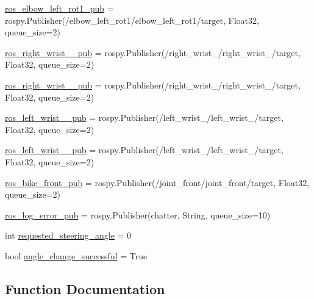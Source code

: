 \begin{DoxyCompactItemize}
\item 
\mbox{\hyperlink{namespacesteering__simulation_a7cf7d50a6b2f01251abedd8a59233be3}{ros\+\_\+elbow\+\_\+left\+\_\+rot1\+\_\+pub}} = rospy.\+Publisher(\textquotesingle{}/elbow\+\_\+left\+\_\+rot1/elbow\+\_\+left\+\_\+rot1/target\textquotesingle{}, Float32, queue\+\_\+size=2)
\item 
\mbox{\hyperlink{namespacesteering__simulation_a8e0b19adafe885231a487bf8378b0fa3}{ros\+\_\+right\+\_\+wrist\+\_\+\_\+pub}} = rospy.\+Publisher(\textquotesingle{}/right\+\_\+wrist\+\_/right\+\_\+wrist\+\_/target\textquotesingle{}, Float32, queue\+\_\+size=2)
\item 
\mbox{\hyperlink{namespacesteering__simulation_a7650fabdc834af9527c1add7de4e3c7e}{ros\+\_\+right\+\_\+wrist\+\_\+\_\+pub}} = rospy.\+Publisher(\textquotesingle{}/right\+\_\+wrist\+\_/right\+\_\+wrist\+\_/target\textquotesingle{}, Float32, queue\+\_\+size=2)
\item 
\mbox{\hyperlink{namespacesteering__simulation_aae568c25dad5bee09d010a369a03d5c4}{ros\+\_\+left\+\_\+wrist\+\_\+\_\+pub}} = rospy.\+Publisher(\textquotesingle{}/left\+\_\+wrist\+\_/left\+\_\+wrist\+\_/target\textquotesingle{}, Float32, queue\+\_\+size=2)
\item 
\mbox{\hyperlink{namespacesteering__simulation_ab5f317214f6776ddc111dee9afe1f0c3}{ros\+\_\+left\+\_\+wrist\+\_\+\_\+pub}} = rospy.\+Publisher(\textquotesingle{}/left\+\_\+wrist\+\_/left\+\_\+wrist\+\_/target\textquotesingle{}, Float32, queue\+\_\+size=2)
\item 
\mbox{\hyperlink{namespacesteering__simulation_a2f98d3e960637df34f895f4ccee97bbe}{ros\+\_\+bike\+\_\+front\+\_\+pub}} = rospy.\+Publisher(\textquotesingle{}/joint\+\_\+front/joint\+\_\+front/target\textquotesingle{}, Float32, queue\+\_\+size=2)
\item 
\mbox{\hyperlink{namespacesteering__simulation_af24aa0340a9184e1a00a96bc8d68aef8}{ros\+\_\+log\+\_\+error\+\_\+pub}} = rospy.\+Publisher(\textquotesingle{}chatter\textquotesingle{}, String, queue\+\_\+size=10)
\item 
int \mbox{\hyperlink{namespacesteering__simulation_a1906425964226a8e34fc3f159b4d54fb}{requested\+\_\+steering\+\_\+angle}} = 0
\item 
bool \mbox{\hyperlink{namespacesteering__simulation_aa5275dfb8d3750aaec001938cd02a97d}{angle\+\_\+change\+\_\+successful}} = True
\end{DoxyCompactItemize}


\subsection{Function Documentation}
\mbox{\label{namespacesteering__simulation_abe8ecf85be641d2a56c547e4e27946ba}} 

